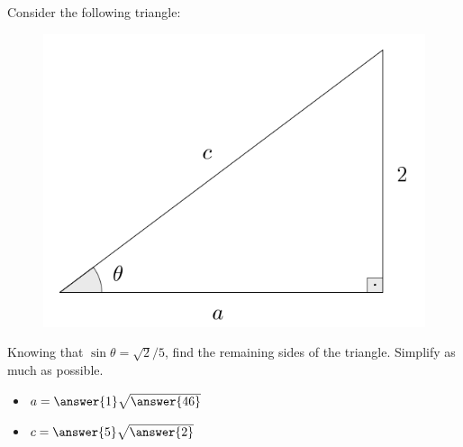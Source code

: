 \documentclass{ximera}
\author{Ivo Terek}
\begin{document}
\begin{exercise}

  Consider the following triangle:

  \begin{figure}[h]
    \centering
    \includegraphics[scale=.3]{RTT3-fig.png}
  \end{figure}
  
  Knowing that $\sin\theta = \sqrt{2}/5$, find the remaining sides of the triangle. Simplify as much as possible. 

  \begin{itemize}
  \item $a = \answer{1}\sqrt{ \answer{46} }$ 
  \item $c = \answer{5}\sqrt{ \answer{2} }$
  \end{itemize}

  
\end{exercise}
\end{document}
